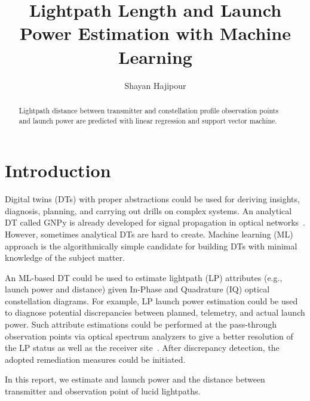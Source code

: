 \documentclass[lettersize,journal, one-column]{IEEEtran}
\begin{document}
\title{Lightpath Length and Launch Power Estimation with Machine Learning}

\author{Shayan Hajipour}


\maketitle

\begin{abstract}
Lightpath distance between transmitter and constellation profile observation points and launch power are predicted with linear regression and support vector machine.
\end{abstract}

\section{Introduction}
\label{section:introduction}
Digital twins (DTs) with proper abstractions could be used for deriving insights, diagnosis, planning, and carrying out drills on complex systems.
An analytical DT called GNPy is already developed for signal propagation in optical networks~\cite{gnpy}.
However, sometimes analytical DTs are hard to create.
Machine learning (ML) approach is the algorithmically simple candidate for building DTs with minimal knowledge of the subject matter.

An ML-based DT could be used to estimate lightpath (LP) attributes (e.g., launch power and distance) given In-Phase and Quadrature (IQ) optical constellation diagrams.
For example, LP launch power estimation could be used to diagnose potential discrepancies between planned, telemetry, and actual launch power. 
Such attribute estimations could be performed at the pass-through observation points via optical spectrum analyzers to give a better resolution of the LP status as well as the receiver site~\cite{9761942}.
After discrepancy detection, the adopted remediation measures could be initiated.

In this report, we estimate and launch power and the distance between transmitter and observation point of lucid lightpaths.
\end{document}
